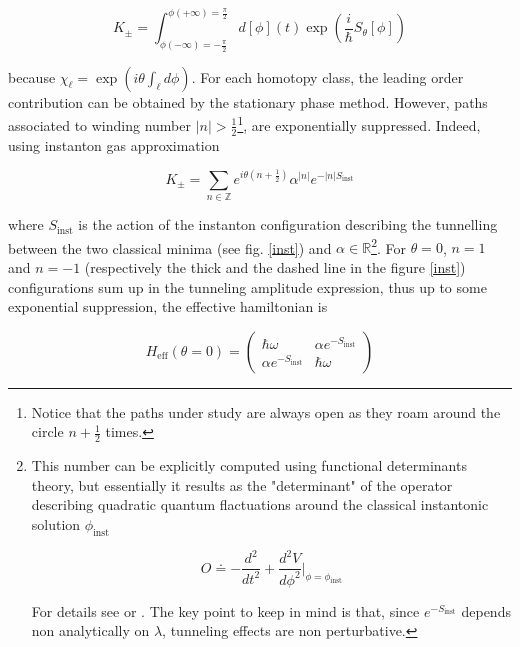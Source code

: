 \begin{equation}
    K_{\pm} = \int_{\phi(-\infty) = -\frac{\pi}{2}}^{\phi(+\infty)= \frac{\pi}{2}} d[\phi](t) \exp(\frac{i}{\hbar} S_{\theta}[\phi]) 
\end{equation}

because $\chi_{\ell} = \exp(i \theta \int_{\ell} d\phi)$. For each homotopy class, the leading order contribution can be obtained by the stationary phase method. However, paths associated to winding number $|n|>\frac{1}{2}$\footnote{Notice that the paths under study are always open as they roam around the circle $n + \frac{1}{2}$ times.}, are exponentially suppressed. Indeed, using instanton gas approximation

\begin{equation}
    K_{\pm} = \sum_{n \in \mathbb{Z}} e^{i \theta  (n + \frac{1}{2}) } \alpha^{|n|} e^{-|n| S_{\text{inst}}}
\end{equation}

where $S_{\text{inst}}$ is the action of the instanton configuration describing the tunnelling between the two classical minima (see fig. \ref{inst}) and $\alpha \in \mathbb{R}$\footnote{This number can be explicitly computed using functional determinants theory, but essentially it results as the "determinant" of the operator describing quadratic quantum flactuations around the classical instantonic solution $\phi_{\text{inst}}$

\begin{equation}
    O \doteq - \frac{d^2}{dt^2} + \frac{d^2 V }{d\phi^2}\bigg|_{\phi = \phi_{\text{inst}}}
\end{equation}

For details see \cite{marino_2015} or \cite{Rattazzi}. The key point to keep in mind is that, since $e^{-S_{\text{inst}}}$ depends non analytically on $\lambda$, tunneling effects are non perturbative.}. 
For $\theta=0$,  $n=1$ and $n=-1$ (respectively the thick and the dashed line in the figure \ref{inst}) configurations sum up in the tunneling amplitude expression, thus up to some exponential suppression, the effective hamiltonian is

\begin{equation}
    H_{\text{eff}}(\theta=0)
= \begin{pmatrix}
 \hbar \omega &\alpha e^{-S_{\text{inst}}} \\
  \alpha e^{-S_{\text{inst}}}  &\hbar \omega
    \end{pmatrix}
\end{equation}

